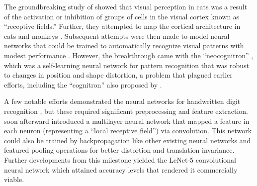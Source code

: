 \documentclass[Journal,letterpaper, SingleSpace, InsideFigs]{ascelike-new}
\begin{document}
The groundbreaking study of  showed that visual perception in cats was a result of the
activation or inhibition of groups of cells in the visual cortex known as ``receptive fields.''  Further, they attempted
to map the cortical architecture in cats and monkeys \cite{hubel1962receptive,hubel1965receptive,hubel1968receptive}.
Subsequent attempts were then made to model neural networks that could be trained to automatically recognize visual patterns with modest performance \cite{rosenblatt1962principles,kabrisky1966proposed,giebel1971feature,fukushima1975cognitron}. However, the breakthrough came with the ``neocognitron'' \cite{fukushima1980neocognitron}, which
was a self-learning neural network for pattern recognition that was robust to changes in position and shape distortion, a problem that plagued earlier efforts, including the ``cognitron'' also proposed by . %

A few notable efforts demonstrated the neural networks for handwritten digit recognition
\cite{fukushima1988neocognitron,denker1988neural}, but these required significant preprocessing and feature
extraction.  soon afterward introduced a multilayer neural network that mapped a feature in each neuron (representing a ``local receptive field'') via convolution. This network could also be trained by backpropagation like other existing neural networks and featured pooling operations for better distortion and
translation invariance. Further developments from this milestone yielded the LeNet-5 convolutional neural network which attained accuracy levels that rendered it commercially viable.
\end{document}
